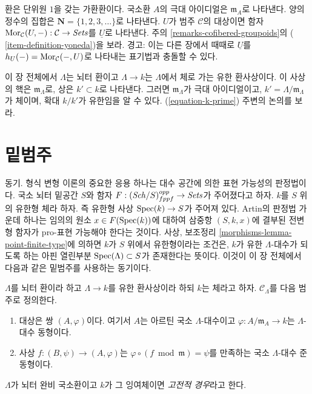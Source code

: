 \noindent
환은 단위원 $1$을 갖는 가환환이다. 국소환 $A$의 극대 아이디얼은
$\mathfrak{m}_A$로 나타낸다. 양의 정수의 집합은
$\mathbf{N} = \{1, 2, 3, \ldots\}$로 나타낸다. $U$가 범주
$\mathcal{C}$의 대상이면 함자
$\mathop{\mathrm{Mor}}\nolimits_\mathcal{C}(U, -): \mathcal{C} \to \textit{Sets}$를
$\underline{U}$로 나타낸다. 주의
\ref{remarks-cofibered-groupoids}의 (
\ref{item-definition-yoneda})을 보라.
경고: 이는 다른 장에서 때때로 $\underline{U}$를
$h_U(-) = \mathop{\mathrm{Mor}}\nolimits_\mathcal{C}(-, U)$로 나타내는 표기법과 충돌할 수 있다.

\medskip\noindent
이 장 전체에서 $\Lambda$는 뇌터 환이고 $\Lambda \to k$는
$\Lambda$에서 체로 가는 유한 환사상이다. 이 사상의 핵은
$\mathfrak m_\Lambda$로, 상은 $k' \subset k$로 나타낸다.
그러면 $\mathfrak m_\Lambda$가 극대 아이디얼이고,
$k' = \Lambda/\mathfrak m_\Lambda$가 체이며, 확대 $k/k'$가 유한임을 알 수 있다.
(\ref{equation-k-prime}) 주변의 논의를 보라.


\section{밑범주}
\label{section-CLambda}

\noindent
동기. 형식 변형 이론의 중요한 응용 하나는 대수 공간에 의한 표현 가능성의
판정법이다. 국소 뇌터 밑공간 $S$와 함자
$F : (\mathit{Sch}/S)_{fppf}^{opp} \to \textit{Sets}$가 주어졌다고 하자.
$k$를 $S$ 위의 유한형 체라 하자. 즉 유한형 사상
$\mathop{\mathrm{Spec}}(k) \to S$가 주어져 있다.
Artin의 판정법 가운데 하나는 임의의 원소 $x \in F(\mathop{\mathrm{Spec}}(k))$에 대하여
삼중항 $(S, k, x)$에 결부된 전변형 함자가 pro-표현 가능해야 한다는 것이다.
사상, 보조정리 \ref{morphisms-lemma-point-finite-type}에 의하면
$k$가 $S$ 위에서 유한형이라는 조건은, $k$가 유한 $\Lambda$-대수가 되도록 하는
아핀 열린부분 $\mathop{\mathrm{Spec}}(\Lambda) \subset S$가 존재한다는 뜻이다. 이것이 이 장
전체에서 다음과 같은 밑범주를 사용하는 동기이다.

\begin{definition}
\label{definition-CLambda}
$\Lambda$를 뇌터 환이라 하고 $\Lambda \to k$를 유한 환사상이라 하되
$k$는 체라고 하자. {\it $\mathcal{C}_\Lambda$}를 다음 범주로 정의한다.
\begin{enumerate}
\item 대상은 쌍 $(A, \varphi)$이다. 여기서 $A$는 아르틴 국소
$\Lambda$-대수이고 $\varphi : A/\mathfrak m_A \to k$는
$\Lambda$-대수 동형이다.
\item 사상 $f : (B, \psi) \to (A, \varphi)$는
$\varphi \circ (f \bmod \mathfrak m) = \psi$를 만족하는 국소
$\Lambda$-대수 준동형이다.
\end{enumerate}
$\Lambda$가 뇌터 완비 국소환이고 $k$가 그 잉여체이면
{\it 고전적 경우}라고 한다.
\end{definition}

